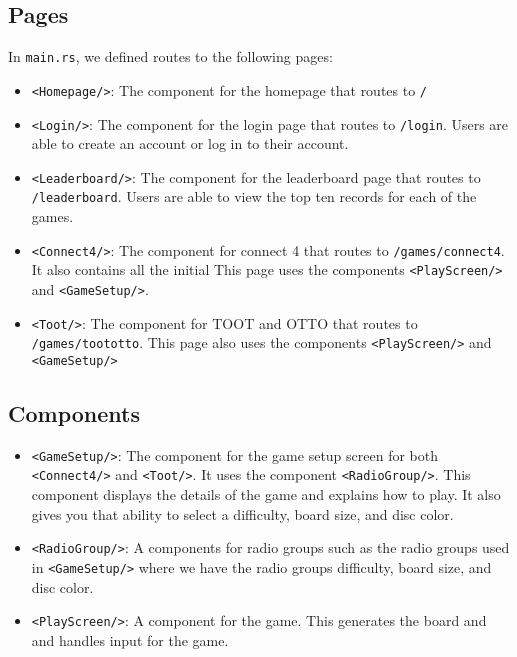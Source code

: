 \documentclass{article}
\begin{document}
\subsection{Pages}
In \texttt{main.rs}, we defined routes to the following pages:
\begin{itemize}
  \item \texttt{<Homepage/>}: The component for the homepage that routes to \texttt{/}
  \item \texttt{<Login/>}: The component for the login page that routes to \texttt{/login}. Users are able to create an account or log in to their account.
  \item \texttt{<Leaderboard/>}: The component for the leaderboard page that routes to \texttt{/leaderboard}. Users are able to view the top ten records for each of the games.
  \item \texttt{<Connect4/>}: The component for connect 4 that routes to \texttt{/games/connect4}. It also contains all the initial This page uses the components \texttt{<PlayScreen/>} and \texttt{<GameSetup/>}.
  \item \texttt{<Toot/>}: The component for TOOT and OTTO that routes to \texttt{/games/toototto}. This page also uses the components \texttt{<PlayScreen/>} and \texttt{<GameSetup/>}
\end{itemize}

\subsection{Components}
\begin{itemize}
  \item \texttt{<GameSetup/>}: The component for the game setup screen for both  \texttt{<Connect4/>} and \texttt{<Toot/>}. It uses the component \texttt{<RadioGroup/>}. This component displays the details of the game and explains how to play. It also gives you that ability to select a difficulty, board size, and disc color. 
  \item \texttt{<RadioGroup/>}: A components for radio groups such as the radio groups used in \texttt{<GameSetup/>} where we have the radio groups difficulty, board size, and disc color. 
  \item \texttt{<PlayScreen/>}: A component for the game. This generates the board and and handles input for the game.
\end{itemize}
\end{document}
